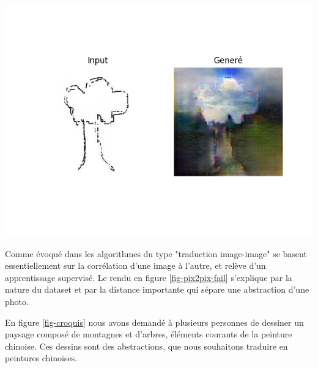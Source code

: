 \documentclass[a4paper, 12pt]{report}
\begin{document}
\begin{center}
\includegraphics[width=0.7\linewidth]{images/pix2pix-fail.png}
\label{fig-pix2pix-fail}
\end{center}

Comme évoqué dans \cite{DBLP:journals/corr/abs-1805-00247} les algorithmes du type "traduction image-image" se basent essentiellement sur la corrélation d'une image à l'autre, et relève d'un apprentissage supervisé. Le rendu en figure \ref{fig-pix2pix-fail} s'explique par la nature du dataset et par la distance importante qui sépare une abstraction d'une photo. 

En figure \ref{fig-croquis} nous avons demandé à plusieurs personnes de dessiner un paysage composé de montagnes et d'arbres, éléments courants de la peinture chinoise. Ces dessins sont des abstractions, que nous souhaitons traduire en peintures chinoises.
\end{document}
